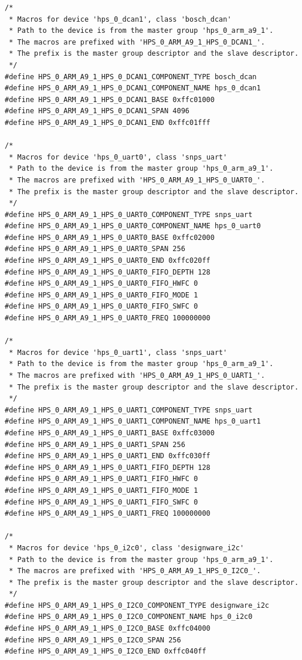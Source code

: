 \documentclass[conference]{IEEEtran}
\begin{document}
\begin{lstlisting}
/*
 * Macros for device 'hps_0_dcan1', class 'bosch_dcan'
 * Path to the device is from the master group 'hps_0_arm_a9_1'.
 * The macros are prefixed with 'HPS_0_ARM_A9_1_HPS_0_DCAN1_'.
 * The prefix is the master group descriptor and the slave descriptor.
 */
#define HPS_0_ARM_A9_1_HPS_0_DCAN1_COMPONENT_TYPE bosch_dcan
#define HPS_0_ARM_A9_1_HPS_0_DCAN1_COMPONENT_NAME hps_0_dcan1
#define HPS_0_ARM_A9_1_HPS_0_DCAN1_BASE 0xffc01000
#define HPS_0_ARM_A9_1_HPS_0_DCAN1_SPAN 4096
#define HPS_0_ARM_A9_1_HPS_0_DCAN1_END 0xffc01fff

/*
 * Macros for device 'hps_0_uart0', class 'snps_uart'
 * Path to the device is from the master group 'hps_0_arm_a9_1'.
 * The macros are prefixed with 'HPS_0_ARM_A9_1_HPS_0_UART0_'.
 * The prefix is the master group descriptor and the slave descriptor.
 */
#define HPS_0_ARM_A9_1_HPS_0_UART0_COMPONENT_TYPE snps_uart
#define HPS_0_ARM_A9_1_HPS_0_UART0_COMPONENT_NAME hps_0_uart0
#define HPS_0_ARM_A9_1_HPS_0_UART0_BASE 0xffc02000
#define HPS_0_ARM_A9_1_HPS_0_UART0_SPAN 256
#define HPS_0_ARM_A9_1_HPS_0_UART0_END 0xffc020ff
#define HPS_0_ARM_A9_1_HPS_0_UART0_FIFO_DEPTH 128
#define HPS_0_ARM_A9_1_HPS_0_UART0_FIFO_HWFC 0
#define HPS_0_ARM_A9_1_HPS_0_UART0_FIFO_MODE 1
#define HPS_0_ARM_A9_1_HPS_0_UART0_FIFO_SWFC 0
#define HPS_0_ARM_A9_1_HPS_0_UART0_FREQ 100000000

/*
 * Macros for device 'hps_0_uart1', class 'snps_uart'
 * Path to the device is from the master group 'hps_0_arm_a9_1'.
 * The macros are prefixed with 'HPS_0_ARM_A9_1_HPS_0_UART1_'.
 * The prefix is the master group descriptor and the slave descriptor.
 */
#define HPS_0_ARM_A9_1_HPS_0_UART1_COMPONENT_TYPE snps_uart
#define HPS_0_ARM_A9_1_HPS_0_UART1_COMPONENT_NAME hps_0_uart1
#define HPS_0_ARM_A9_1_HPS_0_UART1_BASE 0xffc03000
#define HPS_0_ARM_A9_1_HPS_0_UART1_SPAN 256
#define HPS_0_ARM_A9_1_HPS_0_UART1_END 0xffc030ff
#define HPS_0_ARM_A9_1_HPS_0_UART1_FIFO_DEPTH 128
#define HPS_0_ARM_A9_1_HPS_0_UART1_FIFO_HWFC 0
#define HPS_0_ARM_A9_1_HPS_0_UART1_FIFO_MODE 1
#define HPS_0_ARM_A9_1_HPS_0_UART1_FIFO_SWFC 0
#define HPS_0_ARM_A9_1_HPS_0_UART1_FREQ 100000000

/*
 * Macros for device 'hps_0_i2c0', class 'designware_i2c'
 * Path to the device is from the master group 'hps_0_arm_a9_1'.
 * The macros are prefixed with 'HPS_0_ARM_A9_1_HPS_0_I2C0_'.
 * The prefix is the master group descriptor and the slave descriptor.
 */
#define HPS_0_ARM_A9_1_HPS_0_I2C0_COMPONENT_TYPE designware_i2c
#define HPS_0_ARM_A9_1_HPS_0_I2C0_COMPONENT_NAME hps_0_i2c0
#define HPS_0_ARM_A9_1_HPS_0_I2C0_BASE 0xffc04000
#define HPS_0_ARM_A9_1_HPS_0_I2C0_SPAN 256
#define HPS_0_ARM_A9_1_HPS_0_I2C0_END 0xffc040ff


\end{lstlisting}
\end{document}
